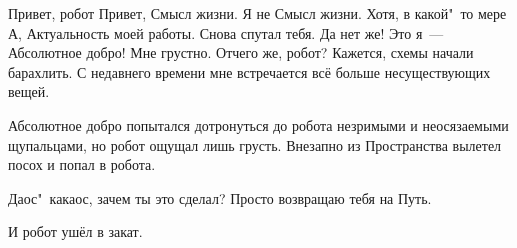\begin{dialog}
\X Привет, робот
\R Привет, Смысл жизни.
\X Я не Смысл жизни. Хотя, в какой"~то мере\ldotst{}
\R А, Актуальность моей работы. Снова спутал тебя.
\X Да нет же! Это я~--- Абсолютное добро!
\R Мне грустно.
\X Отчего же, робот?
\R Кажется, схемы начали барахлить. С недавнего времени мне встречается всё больше несуществующих вещей.
\end{dialog}

\begin{monolog}
Абсолютное добро попытался дотронуться до робота незримыми и неосязаемыми щупальцами, но робот ощущал лишь грусть. Внезапно из Пространства вылетел посох и попал в робота.
\end{monolog}

\begin{dialog}
\R Даос"~какаос, зачем ты это сделал?
\X Просто возвращаю тебя на Путь.
\end{dialog}

\begin{monolog}
И робот ушёл в закат.
\end{monolog}
